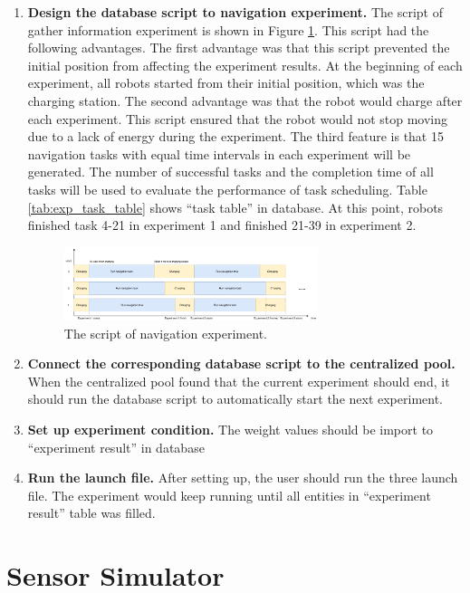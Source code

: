 \begin{enumerate}
 \item \textbf{Design the database script to navigation experiment.} The script of gather information experiment is shown in Figure \ref{fig:nav_exp_timeline}.
 This script had the following advantages. The first advantage was that this script prevented the initial position from affecting the experiment results. At the beginning of each experiment, all robots started from their initial position, which was the charging station. The second advantage was that the robot would charge after each experiment. This script ensured that the robot would not stop moving due to a lack of energy during the experiment. The third feature is that 15 navigation tasks with equal time intervals in each experiment will be generated. The number of successful tasks and the completion time of all tasks will be used to evaluate the performance of task scheduling.
 Table \ref{tab:exp_task_table} shows ``task table'' in database. At this point, robots finished task 4-21 in experiment 1 and finished 21-39 in experiment 2. 
 \begin{figure}[htbp]
    \centering
    \includegraphics[width = 0.7\textwidth]{content/images/ch5/exe_exp_timeline.drawio.png}
    \caption{The script of navigation experiment.}
    \label{fig:nav_exp_timeline}
 \end{figure}
\item \textbf{Connect the corresponding database script to the centralized pool.} When the centralized pool found that the current experiment should end, it should run the database script to automatically start the next experiment.
\item \textbf{Set up experiment condition.} The weight values should be import to ``experiment result'' in database
\item \textbf{Run the launch file.} After setting up, the user should run the three launch file. The experiment would keep running until all entities in ``experiment result'' table was filled.


\end{enumerate}




\section{Sensor Simulator}
\label{sec:sensor_simulatior}

